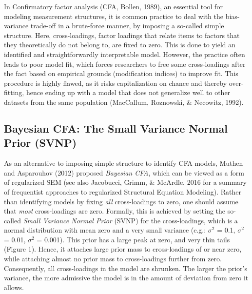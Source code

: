 \documentclass[
  english,
  man]{apa6}
\begin{document}
In Confirmatory factor analysis (CFA, Bollen, 1989), an essential tool for modeling measurement structures, it is common practice to deal with the bias-variance trade-off in a brute-force manner, by imposing a so-called simple structure. Here, cross-loadings, factor loadings that relate items to factors that they theoretically do not belong to, are fixed to zero. This is done to yield an identified and straightforwardly interpretable model. However, the practice often leads to poor model fit, which forces researchers to free some cross-loadings after the fact based on empirical grounds (modification indices) to improve fit. This procedure is highly flawed, as it risks capitalization on chance and thereby over-fitting, hence ending up with a model that does not generalize well to other datasets from the same population (MacCallum, Roznowski, \& Necowitz, 1992).

\hypertarget{bayesian-cfa-the-small-variance-normal-prior-svnp}{%
\subsection{Bayesian CFA: The Small Variance Normal Prior (SVNP)}\label{bayesian-cfa-the-small-variance-normal-prior-svnp}}

As an alternative to imposing simple structure to identify CFA models, Muthen and Asparouhov (2012) proposed \emph{Bayesian CFA}, which can be viewed as a form of regularized SEM (see also Jacobucci, Grimm, \& McArdle, 2016 for a summary of frequentist approaches to regularized Structural Equation Modeling). Rather than identifying models by fixing \emph{all} cross-loadings to zero, one should assume that \emph{most} cross-loadings are zero. Formally, this is achieved by setting the so-called \emph{Small Variance Normal Prior} (SVNP) for the cross-loadings, which is a normal distribution with mean zero and a very small variance (e.g.: \(\sigma^2\) = 0.1, \(\sigma^2\) = 0.01, \(\sigma^2\) = 0.001). This prior has a large peak at zero, and very thin tails (Figure 1). Hence, it attaches large prior mass to cross-loadings of or near zero, while attaching almost no prior mass to cross-loadings further from zero. Consequently, all cross-loadings in the model are shrunken. The larger the prior's variance, the more admissive the model is in the amount of deviation from zero it allows.
\end{document}
